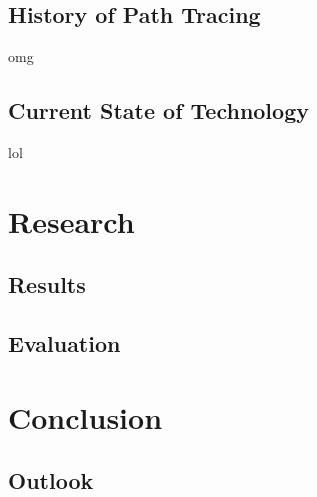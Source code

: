 \documentclass[
  twoside,
  11pt, a4paper,
  footinclude=true,
  headinclude=true,
  cleardoublepage=empty
]{scrreprt}
\begin{document}
\section{History of Path Tracing}
omg

\section{Current State of Technology}
lol
\lipsum[1]

\chapter{Research}
\lipsum[1]

\section{Results}
\lipsum[1]

\section{Evaluation}
\lipsum[1]

\chapter{Conclusion}
\lipsum[1]

\section{Outlook}
\lipsum[1]

\listoffigures
 
\listoftables



    
\end{document}
